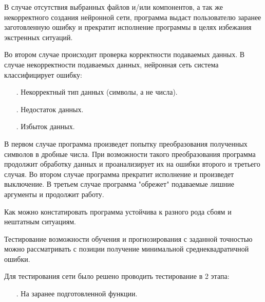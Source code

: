 {	\par \redline В случае отсутствия выбранных файлов и/или компонентов, а так же некорректного создания нейронной сети, программа выдаст пользователю заранее заготовленную ошибку и прекратит исполнение программы в целях избежания экстренных ситуаций.
	
	
	\par \redline Во втором случае происходит проверка корректности подаваемых данных. В случае некорректности подаваемых данных, нейронная сеть система классифицирует ошибку:  
	
	\begin{itemize}[leftmargin=2.15cm, labelwidth=0.65cm, labelsep=0.0cm] 
		
		\item[\theitemcntr. ]  Некорректный тип данных (символы, а не числа).
		\addtocounter{itemcntr}{1}
		
		\item[\theitemcntr. ] Недостаток данных.
		\addtocounter{itemcntr}{1}
		
		\item[\theitemcntr. ] Избыток данных.
		\addtocounter{itemcntr}{1}
		
		\setcounter{itemcntr}{1}
	\end{itemize}  
	
	\par \redline В первом случае программа произведет попытку преобразования полученных символов в дробные числа. При возможности такого преобразования программа продолжит обработку данных и проанализирует их на ошибки второго и третьего случая. Во втором случае программа прекратит исполнение и произведет выключение. В третьем случае программа "обрежет" подаваемые лишние аргументы и продолжит работу.
	
	\par \redline Как можно констатировать программа устойчива к разного рода сбоям и нештатным ситуациям.
	
	\par \redline Тестирование возможности обучения и прогнозирования с заданной точностью можно рассматривать с позиции получение минимальной среднеквадратичной ошибки. 
	
	\par \redline Для тестирования сети было решено проводить тестирование в 2 этапа: 
	
	\begin{itemize}[leftmargin=2.15cm, labelwidth=0.65cm, labelsep=0.0cm] 		
		\item[\theitemcntr. ]  На заранее подготовленной функции.
		\addtocounter{itemcntr}{1}
		

\end{itemize}}
